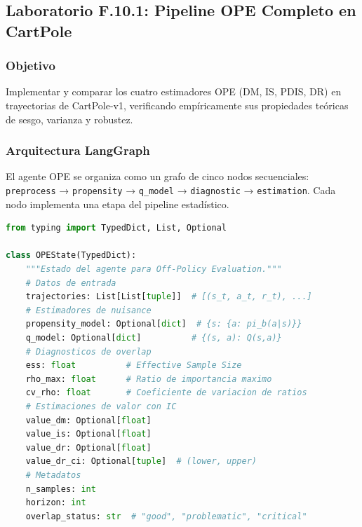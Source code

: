 \bigskip

\subsection*{Laboratorio F.10.1: Pipeline OPE Completo en CartPole}

\subsubsection*{Objetivo}

Implementar y comparar los cuatro estimadores OPE (DM, IS, PDIS, DR) en
trayectorias de CartPole-v1, verificando empíricamente sus propiedades
teóricas de sesgo, varianza y robustez.

\subsubsection*{Arquitectura LangGraph}

El agente OPE se organiza como un grafo de cinco nodos secuenciales:
\texttt{preprocess} → \texttt{propensity} → \texttt{q\_model} →
\texttt{diagnostic} → \texttt{estimation}. Cada nodo implementa una etapa
del pipeline estadístico.

\begin{lstlisting}[language=python, caption={Estado del agente OPE (StateSchema).}]
from typing import TypedDict, List, Optional

class OPEState(TypedDict):
    """Estado del agente para Off-Policy Evaluation."""
    # Datos de entrada
    trajectories: List[List[tuple]]  # [(s_t, a_t, r_t), ...]
    # Estimadores de nuisance
    propensity_model: Optional[dict]  # {s: {a: pi_b(a|s)}}
    q_model: Optional[dict]          # {(s, a): Q(s,a)}
    # Diagnosticos de overlap
    ess: float          # Effective Sample Size
    rho_max: float      # Ratio de importancia maximo
    cv_rho: float       # Coeficiente de variacion de ratios
    # Estimaciones de valor con IC
    value_dm: Optional[float]
    value_is: Optional[float]
    value_dr: Optional[float]
    value_dr_ci: Optional[tuple]  # (lower, upper)
    # Metadatos
    n_samples: int
    horizon: int
    overlap_status: str  # "good", "problematic", "critical"
\end{lstlisting}

